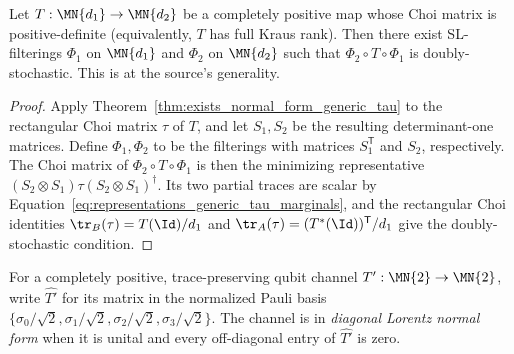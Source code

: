 \begin{theorem}
    \label{thm:exists_normal_form_generic_rect}
    \leanok
    Let $T : \MN{d_1} \to \MN{d_2}$ be a completely positive map whose
    Choi matrix is positive-definite (equivalently, $T$ has full Kraus
    rank). Then there exist SL-filterings $\Phi_{1}$ on $\MN{d_1}$ and
    $\Phi_{2}$ on $\MN{d_2}$ such that $\Phi_{2}\circ T\circ\Phi_{1}$
    is doubly-stochastic.  This is
    \cite[Proposition~2.9]{Wolf2012Quantum} at the source's generality.
\end{theorem}

\begin{proof}\leanok
    Apply Theorem~\ref{thm:exists_normal_form_generic_tau} to the rectangular
    Choi matrix $\tau$ of $T$, and let $S_1,S_2$ be the resulting
    determinant-one matrices. Define $\Phi_1,\Phi_2$ to be the filterings with
    matrices $S_1^{\mathsf T}$ and $S_2$, respectively. The Choi matrix of
    $\Phi_2\circ T\circ\Phi_1$ is then the minimizing representative
    $(S_2\otimes S_1)\tau(S_2\otimes S_1)^\dagger$. Its two partial
    traces are scalar by
    Equation~\eqref{eq:representations_generic_tau_marginals}, and the
    rectangular Choi identities
    $\tr_B(\tau)=T(\Id)/d_1$ and $\tr_A(\tau)=(T^{*}(\Id))^{\mathsf T}/d_1$
    give the doubly-stochastic condition.
\end{proof}

\begin{definition}\label{def:lorentz_diagonal}
    \leanok
    For a completely positive, trace-preserving qubit channel
    $T' : \MN{2} \to \MN{2}$, write $\widehat{T'}$ for its matrix
    in the normalized Pauli basis
    $\{\sigma_{0}/\sqrt{2},\sigma_{1}/\sqrt{2},
        \sigma_{2}/\sqrt{2},\sigma_{3}/\sqrt{2}\}$. The channel is in
    \emph{diagonal Lorentz normal form} when it is unital and every
    off-diagonal entry of $\widehat{T'}$ is zero.
\end{definition}

